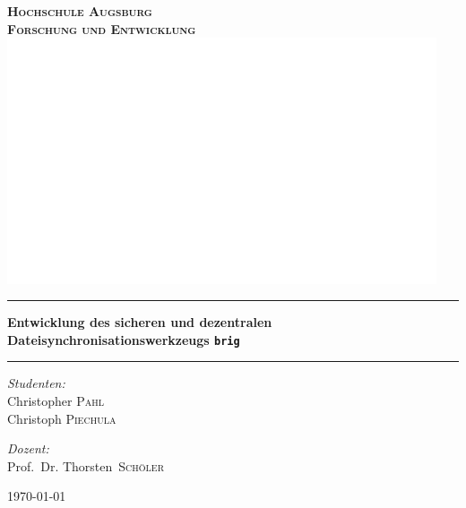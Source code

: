 \documentclass[11pt,ngerman,toc=listof,index=totoc]{scrreprt}
\date{\today}
\begin{document}
\begin{titlepage}
\pagecolor{titlepagecolor}
\begin{center}

\bf
\color{titlepagefontcolor}
\textsc{\huge Hochschule Augsburg}\\[1.5cm]
\textsc{\LARGE Forschung und Entwicklung}\\[0.5cm]
\vspace{1em}
\includegraphics[width=0.95\textwidth]{images/title.png}~\\[1cm]

\rule{\linewidth}{0.5mm}
{\huge \bfseries Entwicklung des sicheren und dezentralen
    Dateisynchronisationswerkzeugs \frqq\texttt{brig}\flqq\\[0.4cm]}
\rule{\linewidth}{0.5mm}

\noindent
\begin{minipage}[t]{0.4\textwidth}
\begin{flushleft} \Large
\emph{Studenten:}\\
\textnormal{Christopher \textsc{Pahl}} \\
\textnormal{Christoph \textsc{Piechula}}
\end{flushleft}
\end{minipage}%
\begin{minipage}[t]{0.4\textwidth}
\begin{flushright} \Large
\emph{Dozent:} \\
\textnormal{Prof.\ Dr. Thorsten\  \textsc{Schöler}} \\
\end{flushright}
\end{minipage}

\vfill

{\large \today}
\end{center}
\end{titlepage}
\nopagecolor
\end{document}
